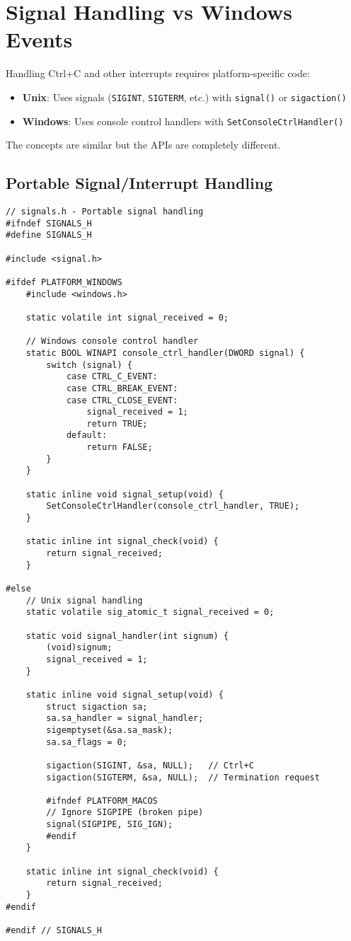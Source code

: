 \section{Signal Handling vs Windows Events}

Handling Ctrl+C and other interrupts requires platform-specific code:

\begin{itemize}
    \item \textbf{Unix}: Uses signals (\texttt{SIGINT}, \texttt{SIGTERM}, etc.) with \texttt{signal()} or \texttt{sigaction()}
    \item \textbf{Windows}: Uses console control handlers with \texttt{SetConsoleCtrlHandler()}
\end{itemize}

The concepts are similar but the APIs are completely different.

\subsection{Portable Signal/Interrupt Handling}

\begin{lstlisting}
// signals.h - Portable signal handling
#ifndef SIGNALS_H
#define SIGNALS_H

#include <signal.h>

#ifdef PLATFORM_WINDOWS
    #include <windows.h>

    static volatile int signal_received = 0;

    // Windows console control handler
    static BOOL WINAPI console_ctrl_handler(DWORD signal) {
        switch (signal) {
            case CTRL_C_EVENT:
            case CTRL_BREAK_EVENT:
            case CTRL_CLOSE_EVENT:
                signal_received = 1;
                return TRUE;
            default:
                return FALSE;
        }
    }

    static inline void signal_setup(void) {
        SetConsoleCtrlHandler(console_ctrl_handler, TRUE);
    }

    static inline int signal_check(void) {
        return signal_received;
    }

#else
    // Unix signal handling
    static volatile sig_atomic_t signal_received = 0;

    static void signal_handler(int signum) {
        (void)signum;
        signal_received = 1;
    }

    static inline void signal_setup(void) {
        struct sigaction sa;
        sa.sa_handler = signal_handler;
        sigemptyset(&sa.sa_mask);
        sa.sa_flags = 0;

        sigaction(SIGINT, &sa, NULL);   // Ctrl+C
        sigaction(SIGTERM, &sa, NULL);  // Termination request

        #ifndef PLATFORM_MACOS
        // Ignore SIGPIPE (broken pipe)
        signal(SIGPIPE, SIG_IGN);
        #endif
    }

    static inline int signal_check(void) {
        return signal_received;
    }
#endif

#endif // SIGNALS_H
\end{lstlisting}

